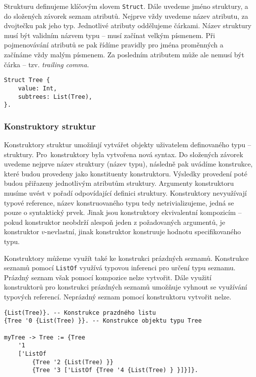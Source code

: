 Strukturu definujeme klíčovým slovem \lstinline{Struct}. Dále uvedeme jméno struktury, a do
složených závorek seznam atributů. Nejprve vždy uvedeme název atributu, za dvojtečku pak jeho typ.
Jednotlivé atributy oddělujeme čárkami. Název struktury musí být validním názvem typu -- musí
začínat velkým písmenem. Při pojmenovávání atributů se pak řídíme pravidly pro jména proměnných
a začínáme vždy malým písmenem. Za posledním atributem může ale nemusí být čárka -- tzv.
\textit{trailing comma}.

\begin{lstlisting}[caption={Příklad definice struktury}]
Struct Tree {
    value: Int,
    subtrees: List(Tree),
}.
\end{lstlisting}

\subsubsection{Konstruktory struktur}

Konstruktory struktur umožňují vytvářet objekty uživatelem definovaného typu -- struktury.
Pro~konstruktory byla vytvořena nová syntax. Do složených závorek uvedeme nejprve název struktury
(název typu), následně pak uvádíme konstrukce, které budou provedeny jako konstituenty konstruktoru.
Výsledky provedení poté budou přiřazeny jednotlivým atributům struktury. Argumenty konstruktoru
musíme uvést v pořadí odpovídající definici struktury. Konstruktory nevyužívají typové reference,
název konstruovaného typu tedy netrivializujeme, jedná se pouze o syntaktický prvek. Jinak jsou
konstruktory ekvivalentní kompozicím -- pokud konstruktor neobdrží alespoň jeden z požadovaných
argumentů, je konstruktor $v$-nevlastní, jinak konstruktor konstruuje hodnotu specifikovaného typu.

Konstruktory můžeme využít také ke konstrukci prázdných seznamů. Konstrukce seznamů pomocí
\lstinline{ListOf} využívá typovou inferenci pro určení typu seznamu. Prázdný seznam však pomocí
kompozice nelze vytvořit. Dále využití konstruktorů pro konstrukci prázdných seznamů umožňuje
vyhnout se využívání typových referencí. Neprázdný seznam pomocí konstruktoru vytvořit nelze.

\begin{lstlisting}[caption={Příklad definice struktury},label=tree-creation]
{List(Tree)}. -- Konstrukce prazdného listu
{Tree '0 {List(Tree) }}. -- Konstrukce objektu typu Tree

myTree -> Tree := {Tree
    '1
    ['ListOf 
        {Tree '2 {List(Tree) }}
        {Tree '3 ['ListOf {Tree '4 {List(Tree) } }]}]}.
\end{lstlisting}


